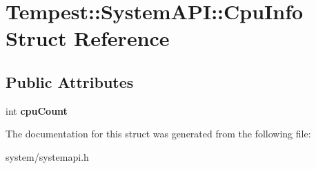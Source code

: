 \hypertarget{struct_tempest_1_1_system_a_p_i_1_1_cpu_info}{\section{Tempest\+:\+:System\+A\+P\+I\+:\+:Cpu\+Info Struct Reference}
\label{struct_tempest_1_1_system_a_p_i_1_1_cpu_info}
}
\subsection*{Public Attributes}
\begin{DoxyCompactItemize}
\item 
\hypertarget{struct_tempest_1_1_system_a_p_i_1_1_cpu_info_a6f11f2be01af875bbce7c5a235a31727}{int {\bfseries cpu\+Count}}\label{struct_tempest_1_1_system_a_p_i_1_1_cpu_info_a6f11f2be01af875bbce7c5a235a31727}

\end{DoxyCompactItemize}


The documentation for this struct was generated from the following file\+:\begin{DoxyCompactItemize}
\item 
system/systemapi.\+h\end{DoxyCompactItemize}
